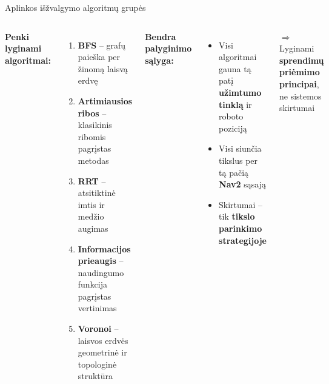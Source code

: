 \documentclass[12pt]{beamer}
\begin{document}
\begin{frame}{Aplinkos išžvalgymo algoritmų grupės}
    \begin{columns}[onlytextwidth]
        \textbf{Penki lyginami algoritmai:}
        \begin{enumerate}
            \item \textbf{BFS} -- grafų paieška per žinomą laisvą erdvę
            \item \textbf{Artimiausios ribos} -- klasikinis ribomis pagrįstas metodas
            \item \textbf{RRT} -- atsitiktinė imtis ir medžio augimas
            \item \textbf{Informacijos prieaugis} -- naudingumo funkcija pagrįstas vertinimas
            \item \textbf{Voronoi} -- laisvos erdvės geometrinė ir topologinė struktūra
        \end{enumerate}

        \textbf{Bendra palyginimo sąlyga:}
        \begin{itemize}
            \item Visi algoritmai gauna tą patį \textbf{užimtumo tinklą} ir roboto poziciją
            \item Visi siunčia tikslus per tą pačią \textbf{Nav2} sąsają
            \item Skirtumai -- tik \textbf{tikslo parinkimo strategijoje}
        \end{itemize}

        \vspace{0.3cm}
        $\Rightarrow$ Lyginami \textbf{sprendimų priėmimo principai}, ne sistemos skirtumai
    \end{columns}
\end{frame}
\end{document}
